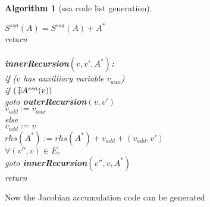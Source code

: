 \documentclass{book}
\newcommand{\notexists}{{ \kern .2em | \kern -.4em \exists }}
\newtheorem{Alg}{Algorithm}
\begin{document}
\begin{Alg}[ssa code list generation]
\begin{tabbing}
\>\> $S^{ssa}(A)=S^{ssa}(A)+A^*$ \\
\> return \\
\\
{\bf innerRecursion$(v,v',A^*)$:}\\
\> if ($v$ has auxilliary variable $v_{aux}$) \\
\>\> if $(\notexists A^{ssa}(v))$\\
\>\>\> goto {\bf outerRecursion}$(v,v')$ \\
\>\> $v_{add}:=v_{aux}$\\
\> else \\
\>\> $v_{add}:=v$\\
\> $rhs(A^*):=rhs(A^*)+v_{add} + (v_{add},v')$\\  
\>\> $\forall (v'',v)\in E_e$ \\
\>\>\> goto {\bf innerRecursion}$(v'',v,A^*)$ \\ 
\> return \\
\end{tabbing}
\end{Alg}

Now the Jacobian accumulation code can be generated 
\end{document}
